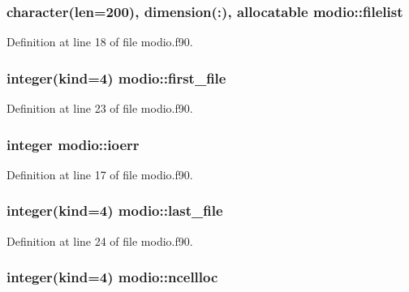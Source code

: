 \subsubsection[{\texorpdfstring{filelist}{filelist}}]{\setlength{\rightskip}{0pt plus 5cm}character(len=200), dimension(\+:), allocatable modio\+::filelist}\hypertarget{namespacemodio_a31e8a393faa96e92df4d56794cd2eadd}{}\label{namespacemodio_a31e8a393faa96e92df4d56794cd2eadd}


Definition at line 18 of file modio.\+f90.

\subsubsection[{\texorpdfstring{first\+\_\+file}{first_file}}]{\setlength{\rightskip}{0pt plus 5cm}integer(kind=4) modio\+::first\+\_\+file}\hypertarget{namespacemodio_a2eee1b20e9f6d0c4ab4e219d76aefc9a}{}\label{namespacemodio_a2eee1b20e9f6d0c4ab4e219d76aefc9a}


Definition at line 23 of file modio.\+f90.

\subsubsection[{\texorpdfstring{ioerr}{ioerr}}]{\setlength{\rightskip}{0pt plus 5cm}integer modio\+::ioerr}\hypertarget{namespacemodio_aea2235cb150c2f86e8564ce3d2e606a1}{}\label{namespacemodio_aea2235cb150c2f86e8564ce3d2e606a1}


Definition at line 17 of file modio.\+f90.

\subsubsection[{\texorpdfstring{last\+\_\+file}{last_file}}]{\setlength{\rightskip}{0pt plus 5cm}integer(kind=4) modio\+::last\+\_\+file}\hypertarget{namespacemodio_a3e203a61ede6084d5dd96d438500b155}{}\label{namespacemodio_a3e203a61ede6084d5dd96d438500b155}


Definition at line 24 of file modio.\+f90.

\subsubsection[{\texorpdfstring{ncellloc}{ncellloc}}]{\setlength{\rightskip}{0pt plus 5cm}integer(kind=4) modio\+::ncellloc}\hypertarget{namespacemodio_a1c862995bd67ce8f4a3305dad6022064}{}\label{namespacemodio_a1c862995bd67ce8f4a3305dad6022064}


